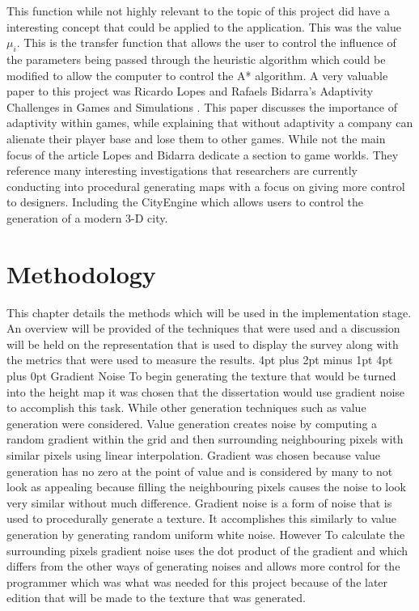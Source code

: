 \documentclass[12pt,a4paper,oneside]{book}
\makeatletter
\renewcommand\section{\@startsection {section}{1}{0mm} %
                               {4pt plus 2pt minus 1pt} %
                               {4pt plus 0pt} %
                               {\bfseries}}
\makeatother
\begin{document}
This function while not highly relevant to the topic of this project did have a interesting concept that could be applied to the application. This was the value \(\mu_i\). This is the transfer function that allows the user to control the influence of the parameters being passed through the heuristic algorithm which could be modified to allow the computer to control the A* algorithm. 
\vspace{5mm} 
\newline
A very valuable paper to this project was Ricardo Lopes and Rafaels Bidarra's Adaptivity Challenges in Games and Simulations \cite{Fun}. This paper discusses the importance of adaptivity within games, while explaining that without adaptivity a company can alienate their player base and lose them to other games. While not the main focus of the article Lopes and Bidarra dedicate a section to game worlds. They reference many interesting investigations that researchers are currently conducting into procedural generating maps with a focus on giving more control to designers. Including the CityEngine which allows users to control the generation of a modern 3-D city. 
\chapter{Methodology}
This chapter details the methods which will be used in the implementation stage. An overview will be provided of the techniques that were used and a discussion will be held on the representation that is used to display the survey along with the metrics that were used to measure the results.
\section{Gradient Noise}
To begin generating the texture that would be turned into the height map it was chosen that the dissertation would use gradient noise to accomplish this task. While other generation techniques such as value generation were considered. Value generation creates noise by computing a random gradient within the grid and then surrounding neighbouring pixels with similar pixels using linear interpolation. Gradient was chosen because value generation has no zero at the point of value and is considered by many to not look as appealing because filling the neighbouring pixels causes the noise to look very similar without much difference.
\vspace{5mm} 
\newline
Gradient noise is a form of noise that is used to procedurally generate a texture. It accomplishes this similarly to value generation by generating random uniform white noise. However To calculate the surrounding pixels gradient noise uses the dot product of the gradient and which differs from the other ways of generating noises and allows more control for the programmer which was what was needed for this project because of the later edition that will be made to the texture that was generated. 
\end{document}
